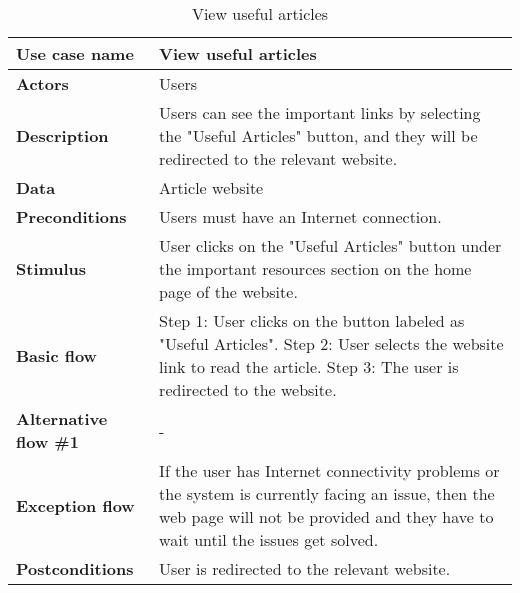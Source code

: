 \documentclass[listof=nochaptergap]{report}
\begin{document}
    \begin{table}[H]
        \centering
         \begin{tabular}{| p{4cm} | p{10cm} |} 
         \hline
         \textbf{Use case name} & View useful articles \\
         \hline
         \textbf{Actors} & Users \\
         \hline
         \textbf{Description} & Users can see the important links by selecting the "Useful Articles" button, and they will be redirected to the relevant website. \\
         \hline
         \textbf{Data} & Article website \\
         \hline
         \textbf{Preconditions} & Users must have an Internet connection. \\
         \hline
         \textbf{Stimulus} & User clicks on the "Useful Articles" button under the important resources section on the home page of the website. \\
         \hline
         \textbf{Basic flow} & Step 1: User clicks on the button labeled as "Useful Articles". \newline Step 2: User selects the website link to read the article. \newline Step 3: The user is redirected to the website. \\
         \hline
         \textbf{Alternative flow \#1} & - \\
         \hline
         \textbf{Exception flow} & If the user has Internet connectivity problems or the system is currently facing an issue, then the web page will not be provided and they have to wait until the issues get solved. \\
         \hline
         \textbf{Postconditions} & User is redirected to the relevant website. \\
         \hline
         \end{tabular}
        \caption{View useful articles}
        \label{tab:table4}
    \end{table}
\end{document}

